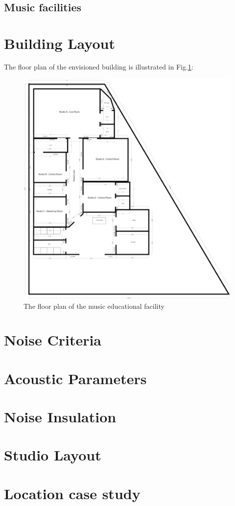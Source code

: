 \documentclass[10pt, twocolumn]{article}
\begin{document}
        \subsection{Music facilities}
    \section{Building Layout}

        The floor plan of the envisioned building is illustrated in Fig.\ref{floorplan}:
        \begin{figure}\label{floorplan}
            \centerline{\includegraphics[scale = 0.8]{resources/floorplan.png}}
            \caption{The floor plan of the music educational facility}
            \centering
        \end{figure}
    \section{Noise Criteria}
        \lipsum

    \section{Acoustic Parameters}
        \lipsum
    \section{Noise Insulation}
        \lipsum
    \section{Studio Layout}

    \section{Location case study}

    
    
\end{document}
